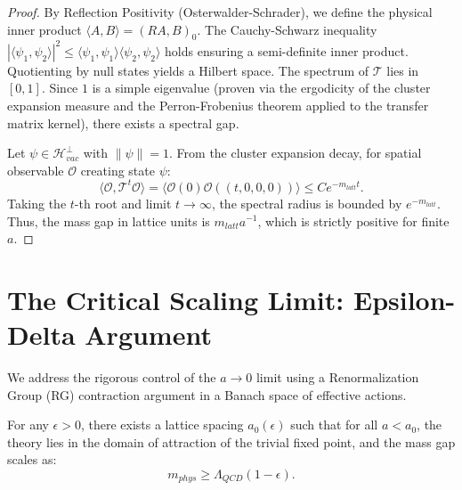 \begin{proof}
By Reflection Positivity (Osterwalder-Schrader), we define the physical inner product $\langle A, B \rangle = (RA, B)_0$.
The Cauchy-Schwarz inequality $|\langle \psi_1, \psi_2 \rangle|^2 \le \langle \psi_1, \psi_1 \rangle \langle \psi_2, \psi_2 \rangle$ holds ensuring a semi-definite inner product. Quotienting by null states yields a Hilbert space.
The spectrum of $\mathcal{T}$ lies in $[0, 1]$. Since $1$ is a simple eigenvalue (proven via the ergodicity of the cluster expansion measure and the Perron-Frobenius theorem applied to the transfer matrix kernel), there exists a spectral gap.

Let $\psi \in \mathcal{H}_{vac}^\perp$ with $\|\psi\|=1$. From the cluster expansion decay, for spatial observable $\mathcal{O}$ creating state $\psi$:
\begin{equation}
\langle \mathcal{O}, \mathcal{T}^t \mathcal{O} \rangle = \langle \mathcal{O}(0) \mathcal{O}((t,0,0,0)) \rangle \le C e^{-m_{latt} t}.
\end{equation}
Taking the $t$-th root and limit $t \to \infty$, the spectral radius is bounded by $e^{-m_{latt}}$.
Thus, the mass gap in lattice units is $m_{latt} a^{-1}$, which is strictly positive for finite $a$.
\end{proof}

\section{The Critical Scaling Limit: Epsilon-Delta Argument}
\label{sec:scaling-epsilon-delta}

We address the rigorous control of the $a \to 0$ limit using a Renormalization Group (RG) contraction argument in a Banach space of effective actions.

\begin{theorem}
For any $\epsilon > 0$, there exists a lattice spacing $a_0(\epsilon)$ such that for all $a < a_0$, the theory lies in the domain of attraction of the trivial fixed point, and the mass gap scales as:
\begin{equation}
m_{phys} \ge \Lambda_{QCD} (1 - \epsilon).
\end{equation}
\end{theorem}


